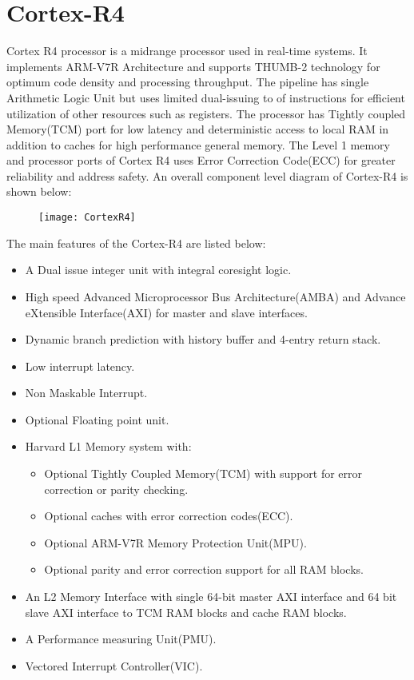 \section{Cortex-R4}
Cortex R4 processor is a midrange processor used in real-time systems.
It implements ARM-V7R Architecture and supports THUMB-2 technology for optimum code density and processing throughput.
The pipeline has single Arithmetic Logic Unit but uses limited dual-issuing to of instructions for efficient utilization of other resources such as registers.
The processor has Tightly coupled Memory(TCM) port for low latency and deterministic access to local RAM in addition to caches for high performance general memory.
The Level 1 memory and processor ports of Cortex R4 uses Error Correction Code(ECC) for greater reliability and address safety.
An overall component level diagram of Cortex-R4 is shown below:
\begin{figure}[h]
	\texttt{[image: CortexR4]}
\end{figure}

The main features of the Cortex-R4 are listed below:
\begin{itemize}{}{}
 \item A Dual issue integer unit with integral coresight logic.
 \item High speed Advanced Microprocessor Bus Architecture(AMBA) and Advance eXtensible Interface(AXI) for master and slave interfaces.
 \item Dynamic branch prediction with history buffer and 4-entry return stack.
 \item Low interrupt latency.
 \item Non Maskable Interrupt.
 \item Optional Floating point unit.
 \item Harvard L1 Memory system with:
 \begin{itemize}{}{}
 	\item Optional Tightly Coupled Memory(TCM) with support for error correction or parity checking.
 	\item Optional caches with error correction codes(ECC).
 	\item Optional ARM-V7R Memory Protection Unit(MPU).
 	\item Optional parity and error correction support for all RAM blocks.
 \end{itemize}
 \item An L2 Memory Interface with single 64-bit master AXI interface and 64 bit slave AXI interface to TCM RAM blocks and cache RAM blocks.
 \item A Performance measuring Unit(PMU).
 \item Vectored Interrupt Controller(VIC).
\end{itemize}

